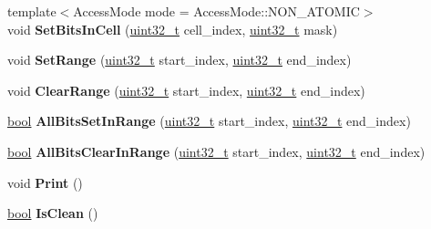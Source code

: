 \begin{DoxyCompactItemize}
{\footnotesize template$<$Access\+Mode mode = Access\+Mode\+::\+N\+O\+N\+\_\+\+A\+T\+O\+M\+IC$>$ }\\void {\bfseries Set\+Bits\+In\+Cell} (\mbox{\hyperlink{classuint32__t}{uint32\+\_\+t}} cell\+\_\+index, \mbox{\hyperlink{classuint32__t}{uint32\+\_\+t}} mask)
\item 
\mbox{\label{classv8_1_1internal_1_1Bitmap_a0547611bc9e8d67730df865662dc83f3}} 
void {\bfseries Set\+Range} (\mbox{\hyperlink{classuint32__t}{uint32\+\_\+t}} start\+\_\+index, \mbox{\hyperlink{classuint32__t}{uint32\+\_\+t}} end\+\_\+index)
\item 
\mbox{\label{classv8_1_1internal_1_1Bitmap_ad6f35f42ead710e4f88a111bd0598835}} 
void {\bfseries Clear\+Range} (\mbox{\hyperlink{classuint32__t}{uint32\+\_\+t}} start\+\_\+index, \mbox{\hyperlink{classuint32__t}{uint32\+\_\+t}} end\+\_\+index)
\item 
\mbox{\label{classv8_1_1internal_1_1Bitmap_a04d486561862dd798649f3e1d2d4408e}} 
\mbox{\hyperlink{classbool}{bool}} {\bfseries All\+Bits\+Set\+In\+Range} (\mbox{\hyperlink{classuint32__t}{uint32\+\_\+t}} start\+\_\+index, \mbox{\hyperlink{classuint32__t}{uint32\+\_\+t}} end\+\_\+index)
\item 
\mbox{\label{classv8_1_1internal_1_1Bitmap_aca673da38ce20057742c26c322cbdd5a}} 
\mbox{\hyperlink{classbool}{bool}} {\bfseries All\+Bits\+Clear\+In\+Range} (\mbox{\hyperlink{classuint32__t}{uint32\+\_\+t}} start\+\_\+index, \mbox{\hyperlink{classuint32__t}{uint32\+\_\+t}} end\+\_\+index)
\item 
\mbox{\label{classv8_1_1internal_1_1Bitmap_a62cecf8d8ab89f87fc4db5555b10b6b0}} 
void {\bfseries Print} ()
\item 
\mbox{\label{classv8_1_1internal_1_1Bitmap_adcc903a3d3788b077a87977dc06122ff}} 
\mbox{\hyperlink{classbool}{bool}} {\bfseries Is\+Clean} ()
\end{DoxyCompactItemize}
